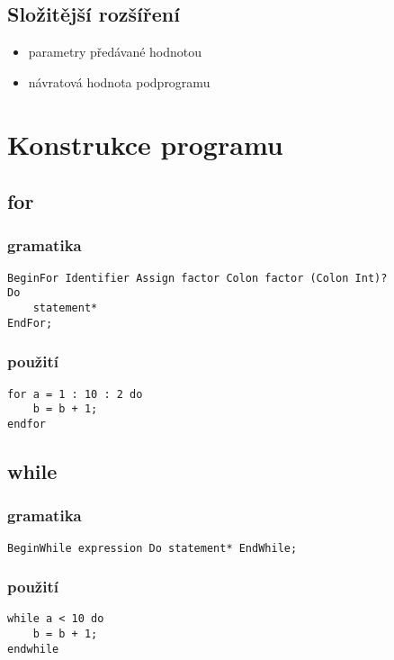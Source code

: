 \documentclass{style}
\begin{document}
\subsection{Složitější rozšíření}
\begin{itemize}
\item parametry předávané hodnotou \\
\item návratová hodnota podprogramu \\
\end{itemize}

\section{Konstrukce programu}
\subsection{for}
\subsubsection{gramatika}
\begin{lstlisting}
BeginFor Identifier Assign factor Colon factor (Colon Int)? 
Do 
	statement* 
EndFor;
\end{lstlisting}

\subsubsection{použití}
\begin{lstlisting}
for a = 1 : 10 : 2 do
	b = b + 1;
endfor
\end{lstlisting}

\subsection{while}
\subsubsection{gramatika}
\begin{lstlisting}
BeginWhile expression Do statement* EndWhile;
\end{lstlisting}

\subsubsection{použití}
\begin{lstlisting}
while a < 10 do
	b = b + 1;
endwhile
\end{lstlisting}
\end{document}
